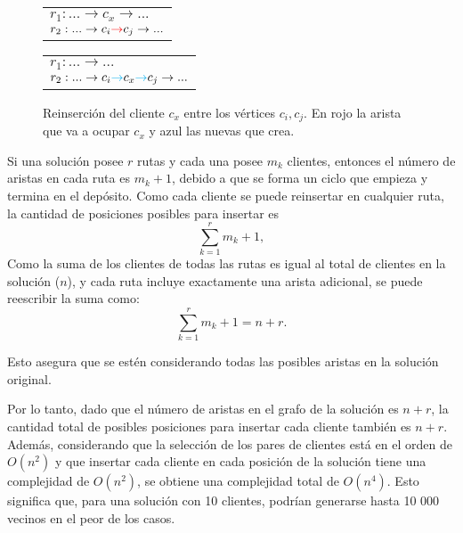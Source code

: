 \documentclass[12pt]{report}
\begin{document}
	\begin{figure}[h]
	\centering
	\begin{minipage}{0.45\textwidth}
			\begin{tabular}{l}
			$r_1: ... \rightarrow c_x \rightarrow ... $ \\
			$r_2: ... \rightarrow c_i \textcolor{red}{\rightarrow} c_j \rightarrow ... $ \\
		\end{tabular}
	\end{minipage}
		\begin{minipage}{0.45\textwidth}
		\begin{tabular}{l}
			$r_1: ... \rightarrow ... $ \\
			$r_2: ... \rightarrow c_i \textcolor{cyan}{\rightarrow} c_x \textcolor{cyan}{\rightarrow} c_j \rightarrow ... $ \\
		\end{tabular}
	\end{minipage}

	\caption{Reinserción del cliente $c_x$ entre los vértices $c_i,c_j$. En rojo la arista que va a ocupar $c_x$ y azul las nuevas que crea.}
	\label{fig:reinsertar_c_x}
\end{figure}


	Si una solución posee $r$ rutas y cada una posee $m_k$ clientes, entonces el número de aristas en cada ruta es $m_k+1$, debido a que se forma un ciclo que empieza y termina en el depósito. Como cada cliente se puede reinsertar en cualquier ruta, la cantidad de posiciones posibles para insertar es
	\[\sum \limits_{k=1} ^r m_k+1,\]
	Como la suma de los clientes de todas las rutas es igual al total de clientes en la solución ($n$), y cada ruta incluye exactamente una arista adicional, se puede reescribir la suma como:
	\[
	\sum \limits_{k=1} ^r m_k+1 = n+r.
	\]

	Esto asegura que se estén considerando todas las posibles aristas en la solución original.

	Por lo tanto, dado que el número de aristas en el grafo de la solución es $n+r$, la cantidad total de posibles posiciones para insertar cada cliente también es $n+r$. Además, considerando que la selección de los pares de clientes está en el orden de $O(n^2)$ y que insertar cada cliente en cada posición de la solución tiene una complejidad de $O(n^2)$, se obtiene una complejidad total de $O(n^4)$. Esto significa que, para una solución con 10 clientes, podrían generarse hasta 10 000 vecinos en el peor de los casos.
\end{document}

